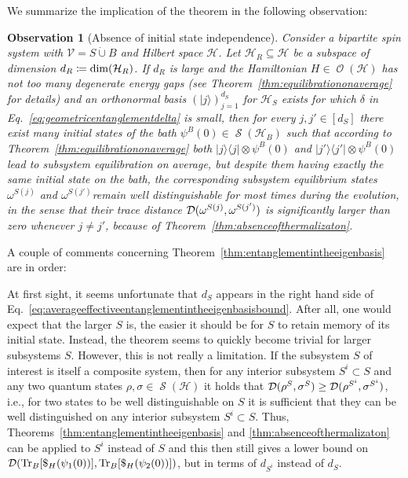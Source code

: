 \documentclass[a4paper,12pt,listof=totoc,index=totoc,bibliography=totoc,headsepline=false,headings=normal,BCOR16.153846mm,DIV12,headinclude,twoside,cleardoublepage=empty,numbers=noenddot,final]{scrreprt}
\theoremstyle{mystyle}
\numberwithin{equation}{section}
\numberwithin{figure}{section}
\numberwithin{lemma}{section}
\numberwithin{theorem}{section}
\numberwithin{corollary}{section}
\numberwithin{definition}{section}
\numberwithin{conjecture}{section}
\newtheorem{observation}{Observation}
\numberwithin{observation}{section}
\newcommand{\+}{\mkern2mu}
\newcommand{\coloneqq}{\mathrel{\vcentcolon\mkern-1.2mu=}} %
\newcommand{\dunion}{\mathbin{\dot{\cup}}}
\newcommand{\texteqref}[1]{Eq.~\eqref{#1}}
\renewcommand{\H}{H}
\newcommand{\Vset}{\mathcal{V}}
\newcommand{\bra}[1]{\langle #1|}
\newcommand{\ket}[1]{|#1\rangle}
\newcommand{\ketbra}[2]{\ket{#1}\!\bra{#2}}
\newcommand{\tracedistance}[3][]{
  \ifthenelse{\equal{#2}{}}
  {\ifthenelse{\equal{#3}{}}
    {\mathcal{D}_{#1}}{}
  }{
    \ifthenelse{\equal{#1}{}}
    {\operatorname{\mathcal{D}}(#2,#3)}
    {\operatorname{\mathcal{D}}_{#1}(#2,#3)}
  }
}
\DeclareMathOperator{\1}{\mathds{1}}
\DeclareMathOperator{\Obs}{\mathcal{O}}
\DeclareMathOperator{\Qst}{\mathcal{S}}
\DeclareMathOperator{\Tr}{Tr}
\newcommand{\mc}[1]{\mathcal{#1}}
\newcommand{\mcH}{\mc{H}}
\begin{document}
We summarize the implication of the theorem in the following observation:
\begin{observation}[Absence of initial state independence] \label{obs:absenceofthermalization}
  Consider a bipartite spin system with $\Vset = S \dunion B$ and Hilbert space $\mcH$.
  Let $\mcH_R \subseteq \mcH$ be a subspace of dimension $d_R \coloneqq \dim(\mcH_R)$.
  If $d_R$ is large and the Hamiltonian $\H \in \Obs(\mcH)$ has not too many degenerate energy gaps (see Theorem~\ref{thm:equilibrationonaverage} for details) and an orthonormal basis $(\ket{j})_{j=1}^{d_S}$ for $\mcH_S$ exists for which $\delta$ in \texteqref{eq:geometricentanglementdelta} is small, then for every $j,j' \in [d_S]$ there exist many initial states of the bath $\psi^B(0) \in \Qst(\mcH_B)$ such that according to Theorem~\ref{thm:equilibrationonaverage} both $\ketbra{j}{j} \otimes \psi^B(0)$ and $\ketbra{j'}{j'} \otimes \psi^B(0)$ lead to subsystem equilibration on average, but despite them having exactly the same initial state on the bath, the corresponding subsystem equilibrium states $\omega^{S(j)}$ and $\omega^{S(j')}$remain well distinguishable for most times during the evolution, in the sense that their trace distance $\tracedistance{\omega^{S(j)}}{\omega^{S(j')}}$ is significantly larger than zero whenever $j \neq j'$, because of Theorem~\ref{thm:absenceofthermalizaton}.
\end{observation}
A couple of comments concerning Theorem~\ref{thm:entanglementintheeigenbasis} are in order:

At first sight, it seems unfortunate that $d_S$ appears in the right hand side of \texteqref{eq:averageeffectiveentanglementintheeigenbasisbound}.
After all, one would expect that the larger $S$ is, the easier it should be for $S$ to retain memory of its initial state.
Instead, the theorem seems to quickly become trivial for larger subsystems $S$.
However, this is not really a limitation.
If the subsystem $S$ of interest is itself a composite system, then for any interior subsystem $S^i \subset S$ and any two quantum states $\rho,\sigma \in \Qst(\mcH)$ it holds that $\tracedistance{\rho^S}{\sigma^S} \geq \tracedistance{\rho^{S^i}}{\sigma^{S^i}}$, i.e., for two states to be well distinguishable on $S$ it is sufficient that they can be well distinguished on any interior subsystem $S^i \subset S$.
Thus, Theorems~\ref{thm:entanglementintheeigenbasis} and \ref{thm:absenceofthermalizaton} can be applied to $S^i$ instead of $S$ and this then still gives a lower bound on $\tracedistance{\Tr_B[\$_\H(\psi_1(0))]}{\Tr_B[\$_\H(\psi_2(0))]}$, but in terms of $d_{S^i}$ instead of $d_S$.
\end{document}
